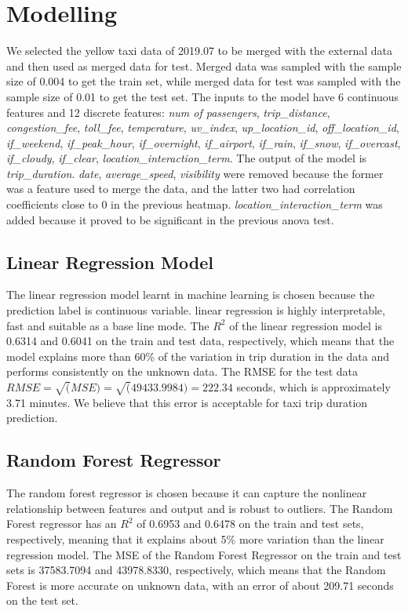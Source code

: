 \documentclass[11pt]{article}
\begin{document}
\section{Modelling}

We selected the yellow taxi data of 2019.07 to be merged with the external data and then used as merged data for test. Merged data was sampled with the sample size of 0.004 to get the train set, while merged data for test was sampled with the sample size of 0.01 to get the test set. The inputs to the model have 6 continuous features and 12 discrete features: \textit{num of passengers}, \textit{trip\_distance}, \textit{congestion\_fee}, \textit{toll\_fee}, \textit{temperature}, \textit{uv\_index}, \textit{up\_location\_id}, \textit{off\_location\_id}, \textit{if\_weekend}, \textit{if\_peak\_hour}, \textit{if\_overnight}, \textit{if\_airport}, \textit{if\_rain}, \textit{if\_snow}, \textit{if\_overcast}, \textit{if\_cloudy}, \textit{if\_clear}, \textit{location\_interaction\_term}. The output of the model is \textit{trip\_duration}. \textit{date}, \textit{average\_speed}, \textit{visibility} were removed because the former was a feature used to merge the data, and the latter two had correlation coefficients close to 0 in the previous heatmap. \textit{location\_interaction\_term} was added because it proved to be significant in the previous anova test.

\subsection{Linear Regression Model}
The linear regression model learnt in machine learning is chosen because the prediction label is continuous variable. linear regression is highly interpretable, fast and suitable as a base line mode. The $R^2$ of the linear regression model is 0.6314 and 0.6041 on the train and test data, respectively, which means that the model explains more than 60\% of the variation in trip duration in the data and performs  consistently on the unknown data. The RMSE for the test data $RMSE = \sqrt(MSE) = \sqrt(49433.9984) = 222.34$ seconds, which is approximately 3.71 minutes. We believe that this error is acceptable for taxi trip duration prediction.


\subsection{Random Forest Regressor}
The random forest regressor is chosen because it can capture the nonlinear relationship between features and output and is robust to outliers\cite{scikit-learn_randomforest}\cite{sectionio_intro_randomforest}. The Random Forest regressor has an $R^2$ of 0.6953 and 0.6478 on the train and test sets, respectively, meaning that it explains about 5\% more variation than the linear regression model. The MSE of the Random Forest Regressor on the train and test sets is 37583.7094 and 43978.8330, respectively, which means that the Random Forest is more accurate on unknown data, with an error of about 209.71 seconds on the test set.
\end{document}
